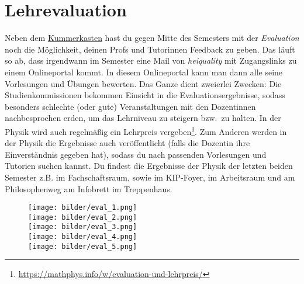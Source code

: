 \section{Lehrevaluation}
\label{eval}



\noindent Neben dem \hyperref[kummerkasten]{Kummerkasten} hast du gegen Mitte des Semesters mit der \emph{Evaluation} noch die Möglichkeit, deinen Profs und Tutorinnen Feedback zu geben. Das läuft so ab, dass irgendwann im Semester eine Mail von \textit{heiquality} mit Zugangslinks zu einem Onlineportal kommt. In diesem Onlineportal kann man dann alle seine Vorlesungen und Übungen bewerten.
Das Ganze dient zweierlei Zwecken: Die Studienkommissionen bekommen Einsicht in die Evaluationsergebnisse, sodass besonders schlechte (oder gute) Veranstaltungen mit den Dozentinnen nachbesprochen erden, um das Lehrniveau zu steigern bzw.\ zu halten. In der Physik wird auch regelmäßig ein Lehrpreis vergeben\footnote{\url{https://mathphys.info/w/evaluation-und-lehrpreis/}}. Zum Anderen werden in der Physik die Ergebnisse auch veröffentlicht (falls die Dozentin ihre Einverständnis gegeben hat), sodass du nach passenden Vorlesungen und Tutorien suchen kannst. Du findest die Ergebnisse der Physik der letzten beiden Semester z.B. im Fachschaftsraum, sowie im \gls{KIP}-Foyer, im Arbeitsraum und am Philosophenweg am Infobrett im Treppenhaus.

\vspace{1cm}


\begin{figure}[h]
    \begin{center}
        \texttt{[image: bilder/eval\_1.png]}\\
        \texttt{[image: bilder/eval\_2.png]}\\
        \texttt{[image: bilder/eval\_3.png]}\\
        \texttt{[image: bilder/eval\_4.png]}\\
        \texttt{[image: bilder/eval\_5.png]}\\
    \end{center}
\end{figure}

\vfill
